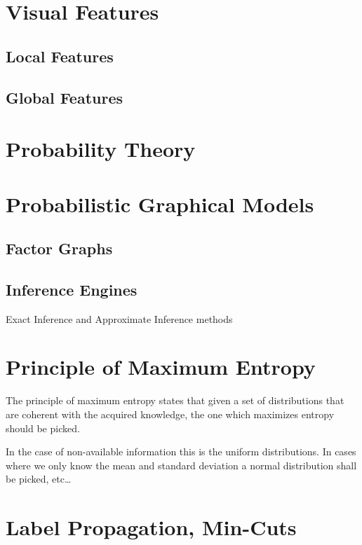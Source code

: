 \section{Visual Features}
\subsection{Local Features}
\subsection{Global Features}

\section{Probability Theory}


\section{Probabilistic Graphical Models}
\label{sec:graphical-models}
\subsection{Factor Graphs}
\subsection{Inference Engines}
Exact Inference and Approximate Inference methods

\section{Principle of Maximum Entropy}
The principle of maximum entropy states that given a set of distributions that
are coherent with the acquired knowledge, the one which maximizes entropy should
be picked.

In the case of non-available information this is the uniform distributions.
In cases where we only know the mean and standard deviation a normal
distribution shall be picked, etc\dots

\section{Label Propagation, Min-Cuts}



